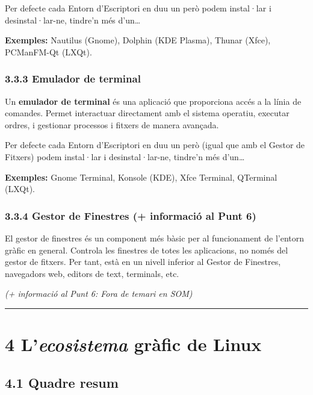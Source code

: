 \documentclass[
  a4paper,
]{article}
\begin{document}
Per defecte cada Entorn d'Escriptori en duu un però podem instal·lar i
desinstal·lar-ne, tindre'n més d'un\ldots{}

\textbf{Exemples:} Nautilus (Gnome), Dolphin (KDE Plasma), Thunar
(Xfce), PCManFM-Qt (LXQt).

\subsubsection{3.3.3 Emulador de terminal}\label{emulador-de-terminal}

Un \textbf{emulador de terminal} és una aplicació que proporciona accés
a la línia de comandes. Permet interactuar directament amb el sistema
operatiu, executar ordres, i gestionar processos i fitxers de manera
avançada.

Per defecte cada Entorn d'Escriptori en duu un però (igual que amb el
Gestor de Fitxers) podem instal·lar i desinstal·lar-ne, tindre'n més
d'un\ldots{}

\textbf{Exemples:} Gnome Terminal, Konsole (KDE), Xfce Terminal,
QTerminal (LXQt).

\subsubsection{3.3.4 Gestor de Finestres (+ informació al Punt
6)}\label{gestor-de-finestres-informaciuxf3-al-punt-6}

El gestor de finestres és un component més bàsic per al funcionament de
l'entorn gràfic en general. Controla les finestres de totes les
aplicacions, no només del gestor de fitxers. Per tant, està en un nivell
inferior al Gestor de Finestres, navegadors web, editors de text,
terminals, etc.

\emph{(+ informació al Punt 6: Fora de temari en SOM)}

\begin{center}\rule{0.5\linewidth}{0.5pt}\end{center}

\section{\texorpdfstring{4 L'\emph{ecosistema} gràfic de
Linux}{4 L'ecosistema gràfic de Linux}}\label{lecosistema-gruxe0fic-de-linux}

\subsection{4.1 Quadre resum}\label{quadre-resum}
\end{document}
